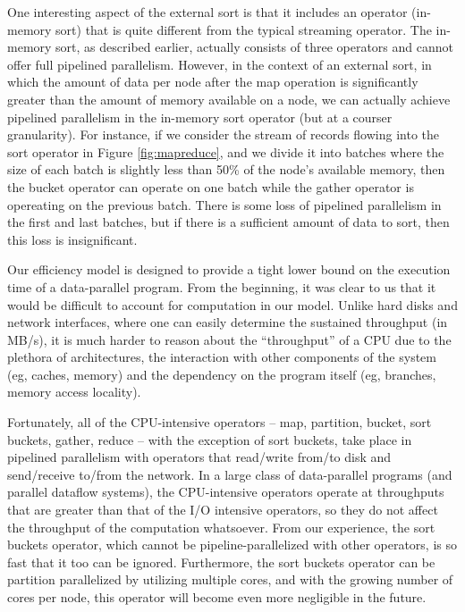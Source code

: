 \documentclass{acm_proc_article-sp}
\begin{document}
One interesting aspect of the external sort is that it includes an operator
(in-memory sort) that is quite different from the typical streaming
operator. The in-memory sort, as described earlier, actually consists of three
operators and cannot offer full pipelined parallelism. However, in the context
of an external sort, in which the amount of data per node after the map
operation is significantly greater than the amount of memory available on a
node, we can actually achieve pipelined parallelism in the in-memory sort
operator (but at a courser granularity). For instance, if we consider the
stream of records flowing into the sort operator in Figure \ref{fig:mapreduce},
and we divide it into batches where the size of each batch is slightly less
than 50\% of the node's available memory, then the bucket operator can operate
on one batch while the gather operator is opereating on the previous batch.
There is some loss of pipelined parallelism in the first and last batches, but
if there is a sufficient amount of data to sort, then this loss is
insignificant.

Our efficiency model is designed to provide a tight lower bound on the
execution time of a data-parallel program. From the beginning, it was clear to
us that it would be difficult to account for computation in our model. Unlike
hard disks and network interfaces, where one can easily determine the sustained
throughput (in MB/s), it is much harder to reason about the ``throughput'' of a
CPU due to the plethora of architectures, the interaction with other components
of the system (eg, caches, memory) and the dependency on the program itself
(eg, branches, memory access locality).

Fortunately, all of the CPU-intensive operators -- map, partition, bucket, sort
buckets, gather, reduce -- with the exception of sort buckets, take place in
pipelined parallelism with operators that read/write from/to disk and
send/receive to/from the network. In a large class of data-parallel programs
(and parallel dataflow systems), the CPU-intensive operators operate at
throughputs that are greater than that of the I/O intensive operators, so they do not affect the
throughput of the computation whatsoever. From our experience, the sort
buckets operator, which cannot be pipeline-parallelized with other operators, is so fast that it too can be ignored. Furthermore, the sort buckets operator can be partition parallelized by utilizing multiple cores, and with the growing number of cores
per node, this operator will become even more negligible in the future.
\end{document}
